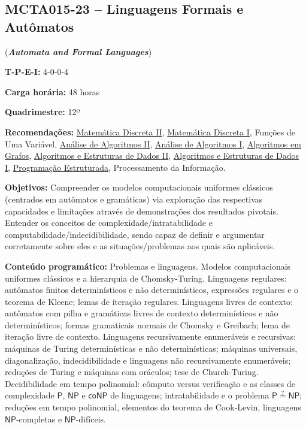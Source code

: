 \documentclass[class=article, crop=false]{standalone}
\begin{document}
\subsection*{MCTA015-23 -- Linguagens Formais e Autômatos}
\label{disc:lfa}

(\textbf{\textit{Automata and Formal Languages}})

\begin{center}
    \begin{minipage}{0.85\textwidth}
        \textbf{T-P-E-I:} 4-0-0-4
        
        \textbf{Carga horária:} 48 horas
        
        \textbf{Quadrimestre:} 12º 
        
        \textbf{Recomendações:} 
        \hyperref[disc:mdII]{Matemática Discreta II},
        \hyperref[disc:mdI]{Matemática Discreta I},
        Funções de Uma Variável,
        \hyperref[disc:aaII]{Análise de Algoritmos II},
        \hyperref[disc:aaI]{Análise de Algoritmos I},
        \hyperref[disc:ag]{Algoritmos em Grafos},
        \hyperref[disc:aedII]{Algoritmos e Estruturas de Dados II},
        \hyperref[disc:aedI]{Algoritmos e Estruturas de Dados I},
        \hyperref[disc:pe]{Programação Estruturada},
        Processamento da Informação.
    \end{minipage}
\end{center}

\textbf{Objetivos:}
Compreender os modelos computacionais uniformes clássicos (centrados em
autômatos e gramáticas) via exploração das respectivas capacidades e limitações
através de demonstrações dos resultados pivotais. 
Entender os conceitos de complexidade/intratabilidade e
computabilidade/indecidibilidade, sendo capaz de definir e argumentar
corretamente sobre eles e as situações/problemas aos quais são aplicáveis.

\textbf{Conteúdo programático:}
Problemas e linguagens.
Modelos computacionais uniformes clássicos e a hierarquia de Chomsky-Turing. 
Linguagens regulares: autômatos finitos determinísticos e não determinísticos,
expressões regulares e o teorema de Kleene; lemas de iteração regulares. 
Linguagens livres de contexto: autômatos com pilha e gramáticas livres de
contexto determinísticos e não determinísticos; formas gramaticais normais de
Chomsky e Greibach; lema de iteração livre de contexto. 
Linguagens recursivamente enumeráveis e recursivas: máquinas de Turing
determinísticas e não determinísticas; máquinas universais, diagonalização,
indecidibilidade e linguagens não recursivamente enumeráveis; reduções de
Turing e máquinas com oráculos; tese de Church-Turing.
Decidibilidade em tempo polinomial: cômputo versus verificação e as classes de
complexidade $\mathsf{P}$, $\mathsf{NP}$ e $\mathsf{coNP}$ de linguagens;
intratabilidade e o problema $\mathsf{P}\stackrel{?}{=}\mathsf{NP}$; reduções
em tempo polinomial, elementos do teorema de Cook-Levin, linguagens
$\mathsf{NP}$-completas e $\mathsf{NP}$-difíceis.
\end{document}
